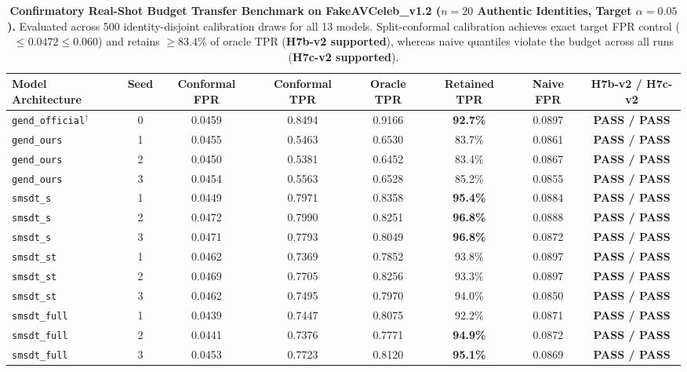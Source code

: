 \begin{table}[t]
\centering
\small
\caption{\textbf{Confirmatory Real-Shot Budget Transfer Benchmark on FakeAVCeleb\_v1.2 ($n=20$ Authentic Identities, Target $\alpha = 0.05$).} Evaluated across 500 identity-disjoint calibration draws for all 13 models. Split-conformal calibration achieves exact target FPR control ($\le 0.0472 \le 0.060$) and retains $\ge 83.4\%$ of oracle TPR (\textbf{H7b-v2 supported}), whereas naive quantiles violate the budget across all runs (\textbf{H7c-v2 supported}).}
\label{tab:real_shot_confirm}
\begin{tabular}{l c c c c c c c}
\toprule
\textbf{Model Architecture} & \textbf{Seed} & \textbf{Conformal FPR} & \textbf{Conformal TPR} & \textbf{Oracle TPR} & \textbf{Retained TPR} & \textbf{Naive FPR} & \textbf{H7b-v2 / H7c-v2} \\
\midrule
\texttt{gend\_official}$^\dagger$ & 0 & 0.0459 & 0.8494 & 0.9166 & \textbf{92.7\%} & 0.0897 & \textbf{PASS / PASS} \\
\midrule
\texttt{gend\_ours} & 1 & 0.0455 & 0.5463 & 0.6530 & 83.7\% & 0.0861 & \textbf{PASS / PASS} \\
\texttt{gend\_ours} & 2 & 0.0450 & 0.5381 & 0.6452 & 83.4\% & 0.0867 & \textbf{PASS / PASS} \\
\texttt{gend\_ours} & 3 & 0.0454 & 0.5563 & 0.6528 & 85.2\% & 0.0855 & \textbf{PASS / PASS} \\
\midrule
\texttt{smsdt\_s} & 1 & 0.0449 & 0.7971 & 0.8358 & \textbf{95.4\%} & 0.0884 & \textbf{PASS / PASS} \\
\texttt{smsdt\_s} & 2 & 0.0472 & 0.7990 & 0.8251 & \textbf{96.8\%} & 0.0888 & \textbf{PASS / PASS} \\
\texttt{smsdt\_s} & 3 & 0.0471 & 0.7793 & 0.8049 & \textbf{96.8\%} & 0.0872 & \textbf{PASS / PASS} \\
\midrule
\texttt{smsdt\_st} & 1 & 0.0462 & 0.7369 & 0.7852 & 93.8\% & 0.0897 & \textbf{PASS / PASS} \\
\texttt{smsdt\_st} & 2 & 0.0469 & 0.7705 & 0.8256 & 93.3\% & 0.0897 & \textbf{PASS / PASS} \\
\texttt{smsdt\_st} & 3 & 0.0462 & 0.7495 & 0.7970 & 94.0\% & 0.0850 & \textbf{PASS / PASS} \\
\midrule
\texttt{smsdt\_full} & 1 & 0.0439 & 0.7447 & 0.8075 & 92.2\% & 0.0871 & \textbf{PASS / PASS} \\
\texttt{smsdt\_full} & 2 & 0.0441 & 0.7376 & 0.7771 & \textbf{94.9\%} & 0.0872 & \textbf{PASS / PASS} \\
\texttt{smsdt\_full} & 3 & 0.0453 & 0.7723 & 0.8120 & \textbf{95.1\%} & 0.0869 & \textbf{PASS / PASS} \\
\bottomrule
\end{tabular}
\end{table}

